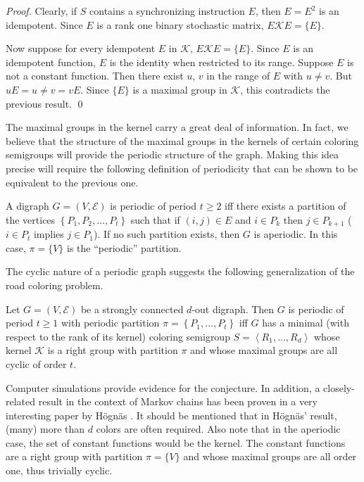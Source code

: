 \begin{proof}
Clearly, if $S$ contains a synchronizing instruction $E$, then $E=E^2$ is an
idempotent. 
Since $E$ is a rank one binary stochastic matrix, $E\mathcal{K}E=\{E\}$.

Now suppose for every idempotent $E$ in $\mathcal{K}$, $E\mathcal{K}E = \{E\}$. 
Since $E$ is an idempotent function, $E$ is the identity when restricted to its range. 
Suppose $E$ is not a constant function. 
Then there exist $u$, $v$ in the range of $E$ with $u\neq v$. 
But $uE=u\neq v=vE$. 
Since $\{E\}$ is a maximal group in $\mathcal{K}$, this contradicts the previous result.
\qed
\end{proof}

The maximal groups in the kernel carry a great deal of information. 
In fact, we believe that the structure of the maximal groups in the kernels of certain coloring semigroups will provide the periodic structure of the graph. 
Making this idea precise will require the following definition of periodicity that can be shown to be equivalent to the previous one.

\begin{definition}          \label{defn:4.3}
A digraph $G=(V,\mathcal{E})$ is periodic of period $t\ge 2$ iff there exists a partition of the vertices $\left\{P_1,P_2,\dots,P_t\right\}$ such that if $(i,j)\in E$  and $i\in P_k$ then $j\in P_{k+1}$ ($i\in P_t$ implies $j\in P_1$). 
If no such partition exists, then $G$ is aperiodic. 
In this case, $\pi=\{V\}$ is the ``periodic'' partition.
\end{definition}

The cyclic nature of a periodic graph suggests the following generalization
of the road coloring problem.

\begin{conjecture}	\label{conj:4.2}
Let $G=(V,\mathcal{E})$ be a strongly connected $d$-out digraph. 
Then $G$ is periodic of period $t\ge 1$ with periodic partition $\pi=\left\{P_1,\dots,P_t\right\}$ iff $G$ has a minimal {\rm(}with respect to the rank of its kernel{\rm )} coloring semigroup $S=\left\langle R_1,\dots,R_d\right\rangle$ whose kernel $\mathcal{K}$ is a right group with partition $\pi$ and  whose maximal groups are all cyclic of order $t$.
\end{conjecture}

Computer simulations provide evidence for the conjecture. 
In addition, a closely-related result in the context of Markov chains has been proven in a very interesting paper by H\"ogn\"as \cite{H}.
It should be mentioned that in H\"ogn\"as' result, (many) more than $d$ colors are often required. 
Also note that in the aperiodic case, the set of constant functions would be the kernel. 
The constant functions are a right group with partition $\pi=\{V\}$ and whose maximal groups are all order one, thus trivially cyclic.
